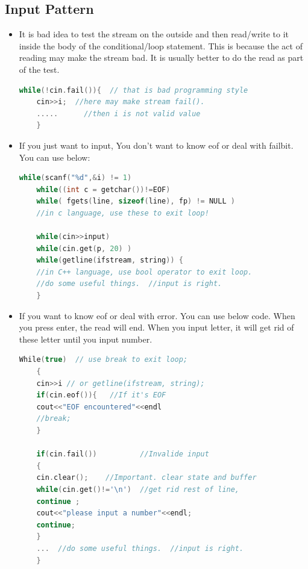 \documentclass[a4paper,11pt,twoside]{book}
\begin{document}
\subsection{Input Pattern}

\begin{itemize}
	\item It is bad idea to test the stream on the outside and then read/write to it inside the body of the conditional/loop statement. This is because the act of reading may make the stream bad. It is usually better to do the read as part of the test.
	
	\begin{lstlisting}[frame=single, language=c++]
	while(!cin.fail()){  // that is bad programming style
	cin>>i;  //here may make stream fail().
	.....      //then i is not valid value
	}
	\end{lstlisting}
	
	\item If you just want to input, You don't want to know eof or deal with failbit. You can use below: \\
	
	\begin{lstlisting}[frame=single, language=c++]
	while(scanf("%d",&i) != 1)
	while((int c = getchar())!=EOF)
	while( fgets(line, sizeof(line), fp) != NULL )
	//in c language, use these to exit loop!
	
	while(cin>>input)
	while(cin.get(p, 20) )
	while(getline(ifstream, string)) {
	//in C++ language, use bool operator to exit loop.
	//do some useful things.  //input is right.
	}
	\end{lstlisting}
	
	\item If you want to know eof or deal with error. You can use below code. When you press enter, the read will end. When you input letter, it will get rid of these letter until you input number. 
	\begin{lstlisting}[frame=single, language=c++]
	While(true)  // use break to exit loop;
	{
	cin>>i // or getline(ifstream, string);
	if(cin.eof()){   //If it's EOF
	cout<<"EOF encountered"<<endl
	//break;
	}
	
	if(cin.fail())          //Invalide input
	{
	cin.clear();    //Important. clear state and buffer
	while(cin.get()!='\n')  //get rid rest of line,
	continue ;
	cout<<"please input a number"<<endl;
	continue;
	}
	...  //do some useful things.  //input is right.
	}
	\end{lstlisting}
	

\end{itemize}
\end{document}
